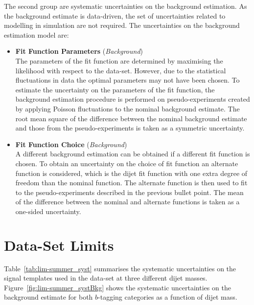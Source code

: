 \vspace{-0.3em}
The second group are systematic uncertainties on the background estimation.
As the background estimate is data-driven, the set of uncertainties related to modelling in simulation are not required.
The uncertainties on the background estimation model are:
\vspace{-0.3em}
\begin{itemize}[leftmargin=*]
\item \textbf{Fit Function Parameters} \hspace{1mm} (\textit{Background})\\
  The parameters of the fit function are determined by maximising the likelihood with respect to the data-set.
  However, due to the statistical fluctuations in data the optimal parameters
  may not have been chosen.
  To estimate the uncertainty on the parameters of the fit function,
  the background estimation procedure is performed on pseudo-experiments created by applying Poisson fluctuations to the nominal background estimate.
  The root mean square of the difference between the nominal background estimate and those from the pseudo-experiments is taken as a symmetric uncertainty. \vspace{0.3em}
\item\textbf{Fit Function Choice}  \hspace{1mm} (\textit{Background})\\
  A different background estimation can be obtained if a different fit function is chosen.
  To obtain an uncertainty on the choice of fit function an alternate function is considered,
  which is the dijet fit function with one extra degree of freedom than the nominal function.
  The alternate function is then used to fit to the pseudo-experiments described in the previous bullet point.
  The mean of the difference between the nominal and alternate functions is taken as a one-sided uncertainty.
\end{itemize}

\clearpage
\section{\summer{} Data-Set Limits}
\label{sec:lim-summer}

Table~\ref{tab:lim-summer_syst} summarises the systematic uncertainties
on the signal templates used in the \summer{} data-set at
three different dijet masses.
Figure~\ref{fig:lim-summer_systBkg} shows the systematic uncertainties on the background estimate
for both $b$-tagging categories as a function of dijet mass.

